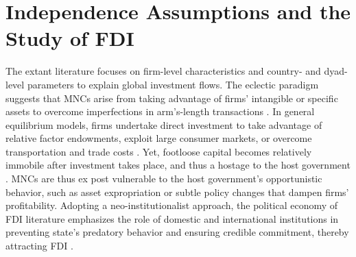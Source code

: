 \documentclass[reqno,onecolumn,letterpaper,12pt]{article}
\begin{document}





\section{Independence Assumptions and the Study of FDI}

The extant literature focuses on firm-level characteristics and country- and dyad-level parameters to explain global investment flows. The eclectic paradigm suggests that MNCs arise from taking advantage of firms' intangible or specific assets to overcome imperfections in arm's-length transactions \citep{Dunning:1988,Dunning:1992}. In general equilibrium models, firms undertake direct investment to take advantage of relative factor endowments, exploit large consumer markets, or overcome transportation and trade costs \citep[e.g.,][]{Helpman:1984,Carr_et_al:2001}. %
Yet, footloose capital becomes relatively immobile after investment takes place, and thus a hostage to the host government \citep{Vernon:1971,Vernon:1980}. MNCs are thus ex post vulnerable to the host government's opportunistic behavior, such as asset expropriation or subtle policy changes that dampen firms' profitability. Adopting a neo-institutionalist approach, the political economy of FDI literature emphasizes the role of domestic and international institutions in preventing state's predatory behavior and ensuring credible commitment, thereby attracting FDI \citep[e.g.,][]{Henisz:2000,Jensen:2003,Jensen:2006,Li_Resnick:2003,Staats_Biglaiser:2012,Buthe_Milner:2008,Allee_Peinhardt:2011,Kerner:2009}.
\end{document}
